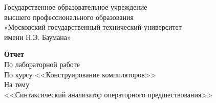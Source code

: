 \begin{titlepage}
	
	
	\thispagestyle{empty}
	
	\begin{figure}[t]
	\end{figure}
	\begin{center}
	Государственное образовательное учреждение\\
	высшего профессионального образования\\
 	«Московский государственный технический университет\\
 	имени Н.Э. Баумана»
	\end{center}
	
	\vspace{5cm}
	
	\begin{center}
		\textbf {Отчет}\\
		По лабораторной работе \\
		По курсу <<Конструирование компиляторов>>\\
		На тему\\
		<<Синтаксический анализатор операторного предшествования>>\\
	\end{center}

	\vspace{8cm}
	

\end{titlepage}
